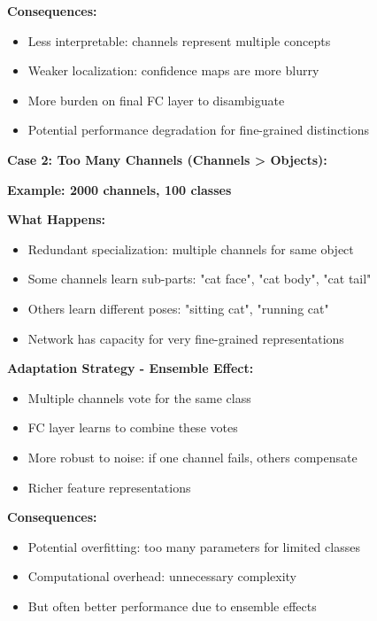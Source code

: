 \documentclass[12pt]{article}
\newcommand{\explanation}[1]{{\color{explanationcolor}#1}}
\begin{document}
\begin{enumerate}[(a)]
{{    \textbf{Consequences:}
    \begin{itemize}
        \item Less interpretable: channels represent multiple concepts
        \item Weaker localization: confidence maps are more blurry
        \item More burden on final FC layer to disambiguate
        \item Potential performance degradation for fine-grained distinctions
    \end{itemize}
    }
    
    \textbf{Case 2: Too Many Channels (Channels > Objects):}
    
    \explanation{
    \textbf{Example: 2000 channels, 100 classes}
    
    \textbf{What Happens:}
    \begin{itemize}
        \item Redundant specialization: multiple channels for same object
        \item Some channels learn sub-parts: "cat face", "cat body", "cat tail"
        \item Others learn different poses: "sitting cat", "running cat"
        \item Network has capacity for very fine-grained representations
    \end{itemize}
    
    \textbf{Adaptation Strategy - Ensemble Effect:}
    \begin{itemize}
        \item Multiple channels vote for the same class
        \item FC layer learns to combine these votes
        \item More robust to noise: if one channel fails, others compensate
        \item Richer feature representations
    \end{itemize}
    
    \textbf{Consequences:}
    \begin{itemize}
        \item Potential overfitting: too many parameters for limited classes
        \item Computational overhead: unnecessary complexity
        \item But often better performance due to ensemble effects
    \end{itemize}
    }
    
}
\end{enumerate}
\end{document}
